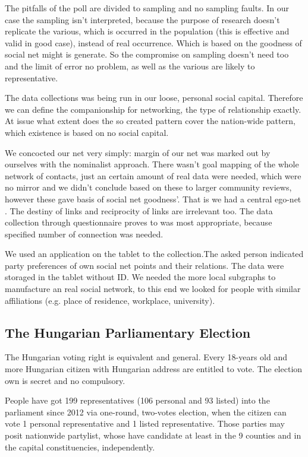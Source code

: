 \documentclass[journal]{IEEEtran}
\begin{document}
The pitfalls of the poll are divided to sampling and no sampling faults. In our case the sampling isn’t interpreted, because the purpose of research doesn’t replicate the various, which is occurred in the population (this is effective and valid in good case), instead of  real occurrence. Which is based on the goodness of social net might is generate.
So the compromise on sampling doesn’t need too and the limit of error no problem, as well as the various are likely to representative. 

The data collections was being run in our loose, personal social capital. Therefore we can define the companionship for networking, the type of relationship exactly. 
At issue what extent does the so created pattern cover the nation-wide pattern, which existence is based on no social capital.

We concocted our net very simply: margin of our net was marked out by ourselves with the nominalist approach. There wasn’t goal mapping of  the whole network of contacts, just an certain amount of real data were needed, which were no mirror and we didn’t conclude based on these to larger community reviews, however these gave basis of social net goodness’. That is we had a central ego-net  \cite{kurtosi}. The destiny of links and reciprocity of links are irrelevant too. 
The data collection through questionnaire proves to was most appropriate, because specified  number of connection was needed.

We used an application on the tablet to the collection.The asked person indicated party preferences of own social net points and their relations.  The data were storaged in the tablet without ID.
We needed the more local subgraphs to manufacture an real social network, to this end we looked for people with similar affiliations (e.g. place of residence, workplace, university).

\subsection{The Hungarian Parliamentary Election}

The Hungarian voting right is equivalent and general. Every 18-years old and more Hungarian citizen with Hungarian address are entitled to vote. The election own is secret and no compulsory.

People have got 199 representatives (106 personal and 93 listed) into the parliament since 2012 via one-round, two-votes election, when the citizen can vote 1 personal representative and 1 listed representative. Those parties may posit nationwide partylist, whose have candidate at least in the 9 counties and in the capital constituencies, independently. 
\end{document}
